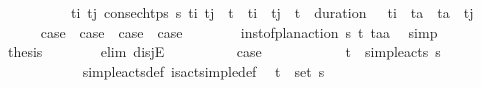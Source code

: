 \begin{isabellebody}
\ \ \ \ \ \ \ \ \ \ {\isacharparenleft}{\kern0pt}{\isasymexists}t\isactrlsub i\ t\isactrlsub j{\isachardot}{\kern0pt}\ consec{\isacharunderscore}{\kern0pt}htps\ {\isasympi}s\ t\isactrlsub i\ t\isactrlsub j\ {\isasymand}\ t\isactrlsub {\isasympi}\ {\isasymle}\ t\isactrlsub i\ {\isasymand}\ t\isactrlsub j\ {\isasymle}\ t\isactrlsub {\isasympi}\ {\isacharplus}{\kern0pt}\ {\isacharparenleft}{\kern0pt}duration\ {\isasympi}{\isacharparenright}{\kern0pt}\ {\isasymand}\ t\isactrlsub i\ {\isacharless}{\kern0pt}\ t\isactrlsub a\ {\isasymand}\ t\isactrlsub a\ {\isacharless}{\kern0pt}\ t\isactrlsub j{\isacharparenright}{\kern0pt}{\isachardoublequoteclose}\isanewline
\ \ \ \ \isamarkupfalse%
\ {\isachardoublequoteopen}{\isacharquery}{\kern0pt}case{}\ {\isasymor}\ {\isacharquery}{\kern0pt}case{}\ {\isasymor}\ {\isacharquery}{\kern0pt}case{}\ {\isasymor}\ {\isacharquery}{\kern0pt}case{}{\isachardoublequoteclose}\isanewline
\ \ \ \ \ \ \isamarkupfalse%
\ {\isacartoucheopen}inst{\isacharunderscore}{\kern0pt}of{\isacharunderscore}{\kern0pt}plan{\isacharunderscore}{\kern0pt}action\ {\isasympi}s\ {\isacharparenleft}{\kern0pt}t\isactrlsub {\isasympi}{\isacharcomma}{\kern0pt}{\isasympi}{\isacharparenright}{\kern0pt}\ {\isacharparenleft}{\kern0pt}t\isactrlsub a{\isacharcomma}{\kern0pt}a{\isacharparenright}{\kern0pt}{\isacartoucheclose}\ \isamarkupfalse%
\ simp\isanewline
\ \ \ \ \isamarkupfalse%
\ \isamarkupfalse%
\ {\isacharquery}{\kern0pt}thesis\isanewline
\ \ \ \ \ \ \isamarkupfalse%
\ {\isacharparenleft}{\kern0pt}elim\ disjE{\isacharparenright}{\kern0pt}\isanewline
\ \ \ \ \ \ \ \ \isamarkupfalse%
\ {\isacharquery}{\kern0pt}case{}\isanewline
\ \ \ \ \ \ \ \ \isamarkupfalse%
\ \isamarkupfalse%
\ {\isachardoublequoteopen}{\isacharparenleft}{\kern0pt}t\isactrlsub {\isasympi}{\isacharcomma}{\kern0pt}{\isasympi}{\isacharparenright}{\kern0pt}\ {\isasymin}\ simple{\isacharunderscore}{\kern0pt}acts\ {\isasympi}s{\isachardoublequoteclose}\isanewline
\ \ \ \ \ \ \ \ \ \ \isamarkupfalse%
\ simple{\isacharunderscore}{\kern0pt}acts{\isacharunderscore}{\kern0pt}def\ is{\isacharunderscore}{\kern0pt}act{\isacharunderscore}{\kern0pt}simple{\isacharunderscore}{\kern0pt}def\ \isamarkupfalse%
\ {\isacartoucheopen}{\isacharparenleft}{\kern0pt}t\isactrlsub {\isasympi}{\isacharcomma}{\kern0pt}{\isasympi}{\isacharparenright}{\kern0pt}\ {\isasymin}\ set\ {\isasympi}s{\isacartoucheclose}\ \isamarkupfalse%

\end{isabellebody}
